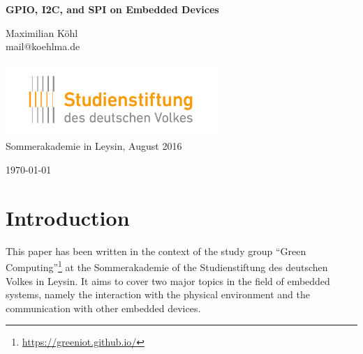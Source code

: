 \documentclass[pdftex,12pt,a4paper,fleqn]{scrartcl}
\title{\doctitle}
\subtitle{\docsubtitle}
\author{\docauthor}
\date{\docdate}
\makeatletter
\newcommand{\doctitle}{GPIO, I2C, and SPI on Embedded Devices}
\newcommand{\docauthor}{Maximilian Köhl}
\newcommand{\docemail}{mail@koehlma.de}
\newcommand{\docdate}{\today}
\makeatother
\begin{document}
\begin{titlepage}
	\begin{center}
		\vspace*{2cm}

		\vspace{4mm}
		{\Large\sffamily \textbf{\doctitle}} \\
		
		\vspace*{1cm}
		
		{\large \docauthor} \\
		\vspace{2mm}
		\docemail
		
		\vspace*{1cm}
		
		\includegraphics[width=8cm]{logo_sdv.pdf} \\
		{\large Sommerakademie in Leysin, August 2016}

	
	  \vspace*{1cm}
	
	  \begin{abstract}
	    \parindent 0pt
      \parskip 6pt
	    \noindent Embedded devices are already widely used in our every day lives without us noticing. With the internet of things they will no longer only control factories, mars rovers, waterworks but also our lights, doors, heating and air conditioning facilities, refrigerators and much more. Furthermore generic embedded platforms are affordable to everyone, not just large companies. Therefore it is possible for everyone to build their own embedded device.
      
      This paper aims to give you a brief overview about embedded and distributed systems as well as a compact introduction to GPIO and the two communication protocols I2C and SPI.
	  \end{abstract}
	
	  \vfill

	  \docdate
	\end{center}
\end{titlepage}

\newpage
\tableofcontents

\newpage

\section{Introduction}
This paper has been written in the context of the study group \enquote{Green Computing}\footnote{\url{https://greeniot.github.io/}} at the Sommerakademie of the Studienstiftung des deutschen Volkes in Leysin. It aims to cover two major topics in the field of embedded systems, namely the interaction with the physical environment and the communication with other embedded devices.
\end{document}
